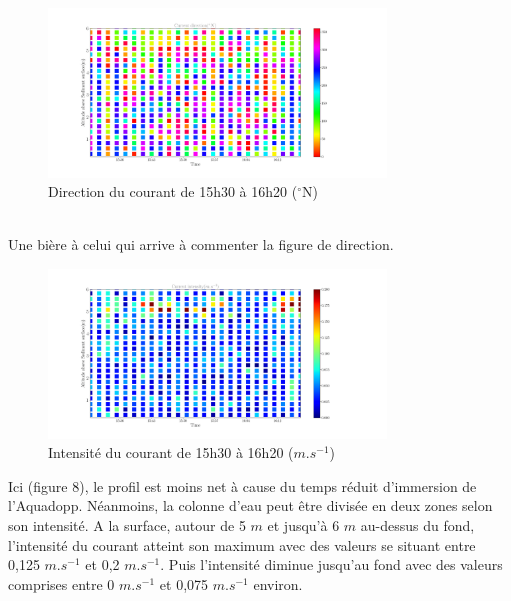 \documentclass[12pt]{article}
\begin{document}
\begin{figure}[!h]
	\begin{center}
		\includegraphics[width=0.8\textwidth]{18032102scatterdirection.png}
		\caption{Direction du courant de 15h30 à 16h20 ($^{\circ}$N)}
	\end{center}
\end{figure}\\
{\normalsize Une bière à celui qui arrive à commenter la figure de direction.}\\

\begin{figure}[!h]
	\begin{center}
		\includegraphics[width=0.8\textwidth]{18032102scatterintensity.png}
		\caption{Intensité du courant de 15h30 à 16h20 ($m.s^{-1}$)}
	\end{center}
\end{figure}
Ici (figure 8), le profil est moins net à cause du temps réduit d'immersion de l'Aquadopp. Néanmoins, la colonne d'eau peut être divisée en deux zones selon son intensité. A la surface, autour de 5 $m$ et jusqu'à 6 $m$ au-dessus du fond, l'intensité du courant atteint son maximum avec des valeurs se situant entre 0,125 $m.s^{-1}$ et 0,2 $m.s^{-1}$. Puis l'intensité diminue jusqu'au fond avec des valeurs comprises entre 0 $m.s^{-1}$ et 0,075 $m.s^{-1}$ environ.\\
\end{document}
